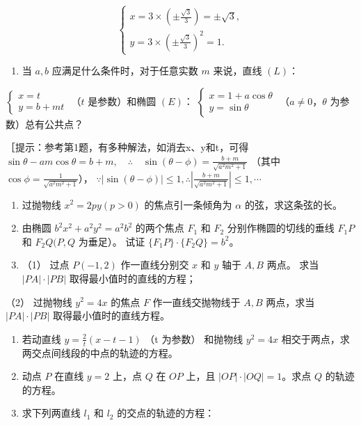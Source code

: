 \[
\left\{ \begin{array}{l} x = 3 \times \left(\pm \frac {\sqrt {3}}{3}\right) = \pm \sqrt {3}, \\ y = 3 \times \left(\pm \frac {\sqrt {3}}{3}\right) ^ {2} = 1. \end{array} \right.
\]

\begin{enumerate}
\def\labelenumi{\arabic{enumi}.}
\setcounter{enumi}{1}
\tightlist
\item
  当 \(a, b\) 应满足什么条件时，对于任意实数 \(m\) 来说，直线 \((L)\)：
\end{enumerate}

\(\left\{ \begin{array}{l} x = t \\ y = b + mt \end{array} \right.\)
（\(t\) 是参数）和椭圆 \((E)\)：
\(\left\{ \begin{array}{l} x = 1 + a \cos \theta \\ y = \sin \theta \end{array} \right.\)
（\(a \neq 0\)，\(\theta\) 为参数）总有公共点？

［提示：参考第1题，有多种解法，如消去x、y和t，可得
\(\sin\theta - am\cos\theta = b + m,\quad \therefore \quad \sin(\theta - \phi) = \frac{b + m}{\sqrt{a^2m^2 + 1}}\)
（其中 \(\cos\phi = \frac{1}{\sqrt{a^2m^2 + 1}}\)），
\(\because |\sin(\theta - \phi)| \leqslant 1,\therefore \left|\frac{b + m}{\sqrt{a^2m^2 + 1}}\right| \leqslant 1,\cdots\)

\begin{enumerate}
\def\labelenumi{\arabic{enumi}.}
\setcounter{enumi}{2}
\item
  过抛物线 \(x^{2} = 2py (p > 0)\) 的焦点引一条倾角为 \(\alpha\)
  的弦，求这条弦的长。
\item
  由椭圆 \(b^{2}x^{2} + a^{2}y^{2} = a^{2}b^{2}\) 的两个焦点 \(F_{1}\)
  和 \(F_{2}\) 分别作椭圆的切线的垂线 \(F_{1}P\) 和 \(F_{2}Q(P, Q\)
  为垂足）。 试证 \(\{F_{1}P\} \cdot \{F_{2}Q\} = b^{2}\)。
\item
  （1） 过点 \(P(-1, 2)\) 作一直线分别交 \(x\) 和 \(y\) 轴于 \(A, B\)
  两点。 求当 \(|PA| \cdot |PB|\) 取得最小值时的直线的方程；
\end{enumerate}

（2） 过抛物线 \(y^{2} = 4x\) 的焦点 \(F\) 作一直线交抛物线于 \(A, B\)
两点，求当 \(|PA| \cdot |PB|\) 取得最小值时的直线方程。

\begin{enumerate}
\def\labelenumi{\arabic{enumi}.}
\setcounter{enumi}{5}
\item
  若动直线 \(y = \frac{2}{t} (x - t - 1)\) （t 为参数） 和抛物线
  \(y^2 = 4x\) 相交于两点，求两交点间线段的中点的轨迹的方程。
\item
  动点 \(P\) 在直线 \(y = 2\) 上，点 \(Q\) 在 \(OP\) 上，且
  \(|OP| \cdot |OQ| = 1\)。求点 \(Q\) 的轨迹的方程。
\item
  求下列两直线 \(l_{1}\) 和 \(l_{2}\) 的交点的轨迹的方程：
\end{enumerate}

